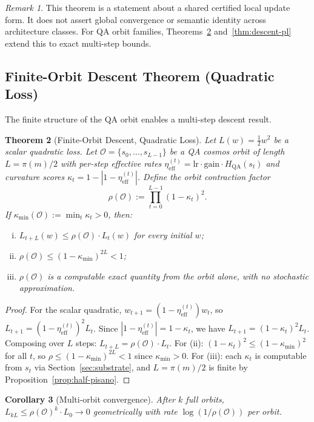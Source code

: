\documentclass[11pt]{article}
\newtheorem{theorem}{Theorem}[section]
\newtheorem{corollary}[theorem]{Corollary}
\theoremstyle{definition}
\theoremstyle{remark}
\newtheorem{remark}[theorem]{Remark}
\newcommand{\hqa}{H_{\mathrm{QA}}}
\newcommand{\etaeff}{\eta_{\mathrm{eff}}}
\newcommand{\kmin}{\kappa_{\min}}
\newcommand{\rhoO}{\rho(\mathcal{O})}
\begin{document}
\begin{remark}
This theorem is a statement about a shared certified local update form. It does not
assert global convergence or semantic identity across architecture classes. For QA
orbit families, Theorems~\ref{thm:descent-quad} and~\ref{thm:descent-pl} extend
this to exact multi-step bounds.
\end{remark}

\subsection{Finite-Orbit Descent Theorem (Quadratic Loss)}

The finite structure of the QA orbit enables a multi-step descent result.

\begin{theorem}[Finite-Orbit Descent, Quadratic Loss]
\label{thm:descent-quad}
Let $L(w)=\tfrac{1}{2}w^2$ be a scalar quadratic loss. Let
$\mathcal{O}=\{s_0,\ldots,s_{L-1}\}$ be a QA cosmos orbit of length
$L=\pi(m)/2$ with per-step effective rates
$\etaeff^{(t)}=\mathrm{lr}\cdot\mathrm{gain}\cdot\hqa(s_t)$ and curvature scores
$\kappa_t=1-|1-\etaeff^{(t)}|$. Define the orbit contraction factor
\[
  \rhoO := \prod_{t=0}^{L-1}(1-\kappa_t)^2.
\]
If $\kmin(\mathcal{O}):=\min_t\kappa_t>0$, then:
\begin{enumerate}[(i)]
  \item $L_{t+L}(w)\leq\rhoO\cdot L_t(w)$ for every initial $w$;
  \item $\rhoO\leq(1-\kmin)^{2L}<1$;
  \item $\rhoO$ is a computable exact quantity from the orbit alone, with no
    stochastic approximation.
\end{enumerate}
\end{theorem}

\begin{proof}
For the scalar quadratic, $w_{t+1}=(1-\etaeff^{(t)})w_t$, so
$L_{t+1}=(1-\etaeff^{(t)})^2 L_t$. Since
$|1-\etaeff^{(t)}|=1-\kappa_t$, we have $L_{t+1}=(1-\kappa_t)^2 L_t$.
Composing over $L$ steps: $L_{t+L}=\rhoO\cdot L_t$.
For (ii): $(1-\kappa_t)^2\leq(1-\kmin)^2$ for all $t$, so
$\rho\leq(1-\kmin)^{2L}<1$ since $\kmin>0$.
For (iii): each $\kappa_t$ is computable from $s_t$ via Section~\ref{sec:substrate},
and $L=\pi(m)/2$ is finite by Proposition~\ref{prop:half-pisano}.
\end{proof}

\begin{corollary}[Multi-orbit convergence]
After $k$ full orbits, $L_{kL}\leq\rhoO^k\cdot L_0\to 0$ geometrically with rate
$\log(1/\rhoO)$ per orbit.
\end{corollary}
\end{document}
